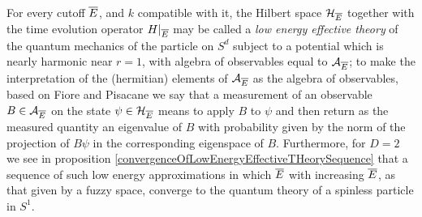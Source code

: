 For every cutoff $\overline{E}$, and $k$ compatible with it, the Hilbert space $\mathcal H_{\overline{E}}$ together with the time evolution operator $H|_{\overline{E}}$ may be called a \textit{low energy effective theory} of the quantum mechanics of the particle on $S^d$ subject to a potential which is nearly harmonic near $r = 1$, with algebra of observables equal to $\mathcal A_{\overline{E}}$; to make the interpretation of the (hermitian) elements of $\mathcal A_{\overline{E}}$ as the algebra of observables, based on Fiore and Pisacane \cite{Fiore2018} we  say that a measurement of an observable $B \in \mathcal A_{\overline{E}}$ on the state $\psi \in \mathcal H_{\overline{E}}$ means to apply $B$ to $\psi$ and then return as the measured quantity an eigenvalue of $B$ with probability given by the norm of the projection of $B \psi$ in the corresponding eigenspace of $B$. 
Furthermore, for $D = 2$ we see in proposition \ref{convergenceOfLowEnergyEffectiveTHeorySequence} that a sequence of such low energy approximations in which $\overline{E}$ with increasing $\overline{E}$, as that given by a fuzzy space, converge to the quantum theory of a spinless particle in $S^1$.

